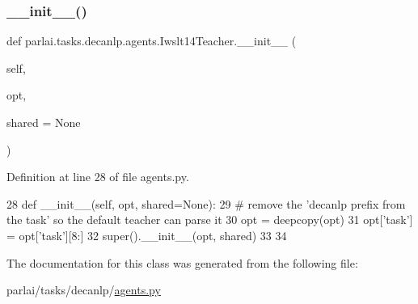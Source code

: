 \subsubsection{\texorpdfstring{\+\_\+\+\_\+init\+\_\+\+\_\+()}{\_\_init\_\_()}}
{\footnotesize\ttfamily def parlai.\+tasks.\+decanlp.\+agents.\+Iwslt14\+Teacher.\+\_\+\+\_\+init\+\_\+\+\_\+ (\begin{DoxyParamCaption}\item[{}]{self,  }\item[{}]{opt,  }\item[{}]{shared = {\ttfamily None} }\end{DoxyParamCaption})}



Definition at line 28 of file agents.\+py.


\begin{DoxyCode}
28     \textcolor{keyword}{def }\_\_init\_\_(self, opt, shared=None):
29         \textcolor{comment}{# remove the 'decanlp prefix from the task' so the default teacher can parse it}
30         opt = deepcopy(opt)
31         opt[\textcolor{stringliteral}{'task'}] = opt[\textcolor{stringliteral}{'task'}][8:]
32         super().\_\_init\_\_(opt, shared)
33 
34 
\end{DoxyCode}


The documentation for this class was generated from the following file\+:\begin{DoxyCompactItemize}
\item 
parlai/tasks/decanlp/\hyperlink{parlai_2tasks_2decanlp_2agents_8py}{agents.\+py}\end{DoxyCompactItemize}

